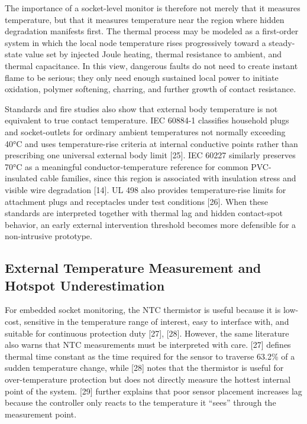 The importance of a socket-level monitor is therefore not merely that it
measures temperature, but that it measures temperature near the region
where hidden degradation manifests first. The thermal process may be
modeled as a first-order system in which the local node temperature
rises progressively toward a steady-state value set by injected Joule
heating, thermal resistance to ambient, and thermal capacitance. In this
view, dangerous faults do not need to create instant flame to be
serious; they only need enough sustained local power to initiate
oxidation, polymer softening, charring, and further growth of contact
resistance.

Standards and fire studies also show that external body temperature is
not equivalent to true contact temperature. IEC 60884-1 classifies
household plugs and socket-outlets for ordinary ambient temperatures not
normally exceeding 40°C and uses temperature-rise criteria at internal
conductive points rather than prescribing one universal external body
limit {[}25{]}. IEC 60227 similarly preserves 70°C as a meaningful
conductor-temperature reference for common PVC-insulated cable families,
since this region is associated with insulation stress and visible wire
degradation {[}14{]}. UL 498 also provides temperature-rise limits for
attachment plugs and receptacles under test conditions {[}26{]}. When
these standards are interpreted together with thermal lag and hidden
contact-spot behavior, an early external intervention threshold becomes
more defensible for a non-intrusive prototype.

\subsection{External Temperature Measurement and Hotspot Underestimation}\label{external-temperature-measurement-and-hotspot-underestimation}

For embedded socket monitoring, the NTC thermistor is useful because it
is low-cost, sensitive in the temperature range of interest, easy to
interface with, and suitable for continuous protection duty {[}27{]},
{[}28{]}. However, the same literature also warns that NTC measurements
must be interpreted with care. {[}27{]} defines thermal time constant as
the time required for the sensor to traverse 63.2\% of a sudden
temperature change, while {[}28{]} notes that the thermistor is useful
for over-temperature protection but does not directly measure the
hottest internal point of the system. {[}29{]} further explains that
poor sensor placement increases lag because the controller only reacts
to the temperature it ``sees'' through the measurement point.

